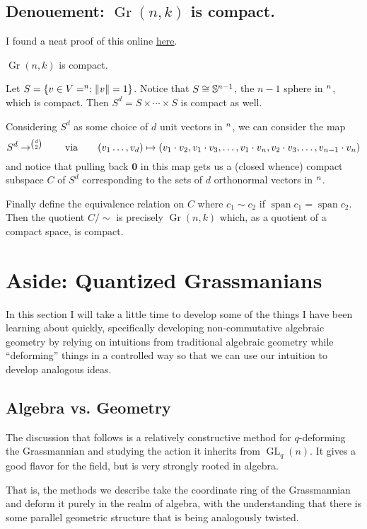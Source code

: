 \documentclass[12pt]{article}
\DeclareMathOperator{\Gr}{Gr}
\DeclareMathOperator{\GL}{GL}
\let\k\relax
\newcommand{\k}{\mathbbm{k}}
\begin{document}
\subsection{Denouement: \texorpdfstring{$\Gr(n,k)$}{Gr(n,k)} is compact.}
I found a neat proof of this online \href{https://math.stackexchange.com/questions/148088/compactness-of-the-grassmannian}{here}.
\begin{prop}
	$\Gr(n,k)$ is compact.
\end{prop}
\begin{prf}
	Let $S=\{v\in V=\k^n: \|v\|=1\}$. Notice that $S\cong \mathbb{S}^{n-1}$, the $n-1$ sphere in $\k^n$, which is compact. Then $S^d=S\times \cdots\times S$ is compact as well.

	Considering $S^d$ as some choice of $d$ unit vectors in $\k^n$, we can consider the map 
	\[S^d\to\k^{\binom{d}{2}}\qquad\text{via}\qquad (v_1\dots,v_d)\mapsto (v_1\cdot v_2,v_1\cdot v_3,\dots,v_1\cdot v_n,v_2\cdot v_3,\dots,v_{n-1}\cdot v_n)\]
	and notice that pulling back $\mathbf 0$ in this map gets us a (closed whence) compact subspace $C$ of $S^d$ corresponding to the 
	sets of $d$ orthonormal vectors in $\k^n$.

	Finally define the equivalence relation on $C$ where $c_1\sim c_2$ if $\operatorname{span} c_1=\operatorname{span} c_2$. Then the quotient 
	$C/\sim$ is precisely $\Gr(n,k)$ which, as a quotient of a compact space, is compact.
\end{prf}

\section{Aside: Quantized Grassmanians}
In this section I will take a little time to develop some of the things I have been learning about quickly,
specifically developing non-commutative algebraic geometry by relying on intuitions from traditional algebraic geometry 
while ``deforming'' things in a controlled way so that we can use our intuition to develop analogous ideas.

\subsection{Algebra vs. Geometry}
The discussion that follows is a relatively constructive method for $q$-deforming the Grassmannian and studying the action it 
inherits from $\GL_q(n)$. It gives a good flavor for the field, but is very strongly rooted in algebra.

That is, the methods we describe take the coordinate ring of the Grassmannian and deform it purely in the realm of algebra, with the understanding 
that there is some parallel geometric structure that is being analogously twisted.
\end{document}
